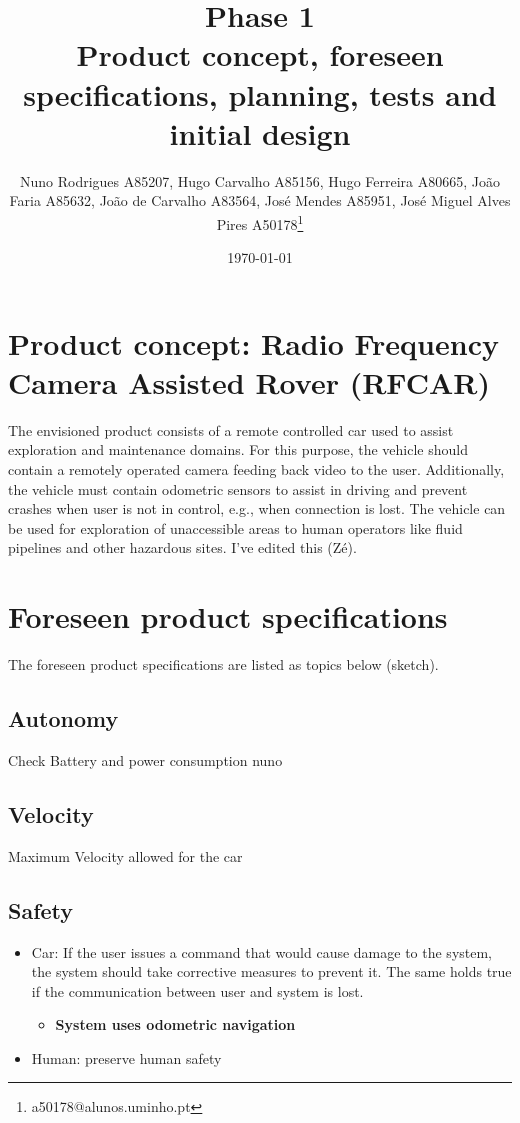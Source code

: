 \documentclass[11pt]{article}
\author{Nuno Rodrigues A85207, Hugo Carvalho A85156, Hugo Ferreira A80665, João Faria A85632, João de Carvalho A83564, José Mendes A85951, José Miguel Alves Pires A50178\thanks{a50178@alunos.uminho.pt}}
\date{\today}
\title{Phase 1\\\medskip
\large Product concept, foreseen specifications, planning, tests and initial design}
\begin{document}
\maketitle
\tableofcontents


\section{Product concept: Radio Frequency Camera Assisted Rover (RFCAR)}
\label{sec:orge7b0dc6}
The envisioned product consists of a remote controlled car used to assist
exploration and maintenance domains. For this purpose, the vehicle should contain a
remotely operated camera feeding back video to the user.
Additionally, the
vehicle must contain odometric sensors to assist in driving and prevent
crashes when user is not in control, e.g., when connection is lost.
The vehicle can be used for exploration of unaccessible areas to human operators
like fluid pipelines and other hazardous sites.
I've edited this (Zé).

\section{Foreseen product specifications}
\label{sec:org31f7574}
The foreseen product specifications are listed as topics below (sketch).

\subsection{Autonomy}
\label{sec:org7364ba5}
Check Battery and power consumption nuno
\subsection{Velocity}
\label{sec:org08718bc}
Maximum Velocity allowed for the car
\subsection{Safety}
\label{sec:org83942c3}
\begin{itemize}
\item Car: If the user issues a command that would cause damage to the system, the
system should take corrective measures to prevent it. The same holds true if
the communication between user and system is lost.
\begin{itemize}
\item \textbf{System uses odometric navigation}
\end{itemize}
\item Human: preserve human safety
\end{itemize}
\end{document}
